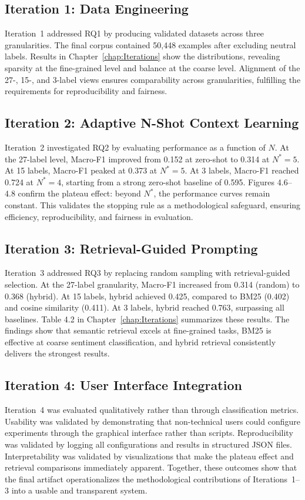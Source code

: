 \subsection{Iteration 1: Data Engineering}
Iteration~1 addressed RQ1 by producing validated datasets across three granularities. The final corpus contained 50,448 examples after excluding neutral labels. Results in Chapter~\ref{chap:Iterations} show the distributions, revealing sparsity at the fine-grained level and balance at the coarse level. Alignment of the 27-, 15-, and 3-label views ensures comparability across granularities, fulfilling the requirements for reproducibility and fairness.  

\subsection{Iteration 2: Adaptive N-Shot Context Learning}
Iteration~2 investigated RQ2 by evaluating performance as a function of $N$. At the 27-label level, Macro-F1 improved from 0.152 at zero-shot to 0.314 at $N^{\ast}=5$. At 15 labels, Macro-F1 peaked at 0.373 at $N^{\ast}=5$. At 3 labels, Macro-F1 reached 0.724 at $N^{\ast}=4$, starting from a strong zero-shot baseline of 0.595. Figures 4.6–4.8 confirm the plateau effect: beyond $N^{\ast}$, the performance curves remain constant. This validates the stopping rule as a methodological safeguard, ensuring efficiency, reproducibility, and fairness in evaluation.  

\subsection{Iteration 3: Retrieval-Guided Prompting}
Iteration~3 addressed RQ3 by replacing random sampling with retrieval-guided selection. At the 27-label granularity, Macro-F1 increased from 0.314 (random) to 0.368 (hybrid). At 15 labels, hybrid achieved 0.425, compared to BM25 (0.402) and cosine similarity (0.411). At 3 labels, hybrid reached 0.763, surpassing all baselines. Table 4.2 in Chapter~\ref{chap:Iterations} summarizes these results. The findings show that semantic retrieval excels at fine-grained tasks, BM25 is effective at coarse sentiment classification, and hybrid retrieval consistently delivers the strongest results.  

\subsection{Iteration 4: User Interface Integration}
Iteration~4 was evaluated qualitatively rather than through classification metrics. Usability was validated by demonstrating that non-technical users could configure experiments through the graphical interface rather than scripts. Reproducibility was validated by logging all configurations and results in structured JSON files. Interpretability was validated by visualizations that make the plateau effect and retrieval comparisons immediately apparent. Together, these outcomes show that the final artifact operationalizes the methodological contributions of Iterations~1–3 into a usable and transparent system.  

